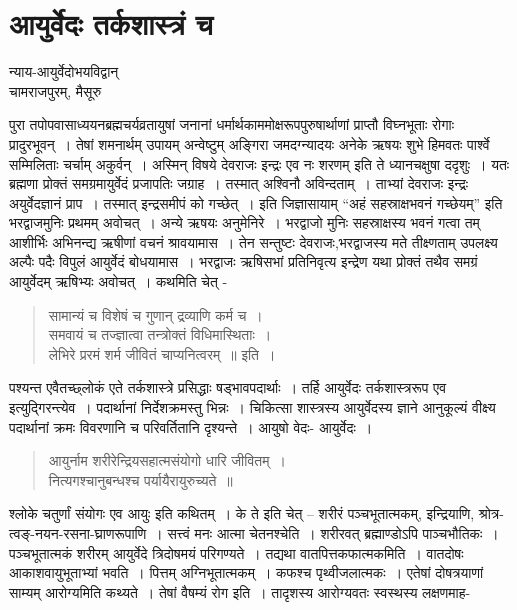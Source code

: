 {\fontsize{15}{17}\selectfont
\presetvalues
\chapter{आयुर्वेदः तर्कशास्त्रं च}

\begin{center}
\smallskip

न्याय-आयुर्वेदोभयविद्वान्\\
चामराजपुरम्, मैसूरु
\addrule
\end{center}

पुरा तपोपवासाध्ययनब्रह्मचर्यव्रतायुषां जनानां धर्मार्थकाममोक्षरूपपुरुषार्थाणां प्राप्तौ विघ्नभूताः रोगाः प्रादुरभूवन्~। तेषां शमनार्थम् उपायम् अन्वेष्टुम् अङ्गिरा जमदग्न्यादयः अनेके ऋषयः शुभे हिमवतः पार्श्वे सम्मिलिताः चर्चाम् अकुर्वन्~। अस्मिन् विषये देवराजः इन्द्रः एव नः शरणम् इति ते ध्यानचक्षुषा ददृशुः~। यतः ब्रह्मणा प्रोक्तं समग्रमायुर्वेदं प्रजापतिः जग्राह~। तस्मात् अश्विनौ अविन्दताम्~। ताभ्यां देवराजः इन्द्रः अयुर्वेदज्ञानं प्राप~। तस्मात् इन्द्रसमीपं को गच्छेत्~। इति जिज्ञासायाम् “अहं सहस्राक्षभवनं गच्छेयम्” इति भरद्वाजमुनिः प्रथमम् अवोचत्~। अन्ये ऋषयः अनुमेनिरे~। भरद्वाजो मुनिः सहस्राक्षस्य भवनं गत्वा तम् आशीर्भिः अभिनन्द्य ऋषीणां वचनं श्रावयामास~। तेन सन्तुष्टः देवराजः,भरद्वाजस्य मते तीक्ष्णताम् उपलक्ष्य अल्पैः पदैः विपुलं आयुर्वेदं बोधयामास~। भरद्वाजः ऋषिसभां प्रतिनिवृत्य इन्द्रेण यथा प्रोक्तं तथैव समग्रं आयुर्वेदम् ऋषिभ्यः अवोचत्~। कथमिति चेत् -
\begin{verse}
सामान्यं च विशेषं च गुणान् द्रव्याणि कर्म च~। \\
समवायं च तज्ज्ञात्वा तन्त्रोक्तं विधिमास्थिताः~। \\
लेभिरे प्ररमं शर्म जीवितं चाप्यनित्वरम्~॥ इति~। 
\end{verse}
पश्यन्त एवैतच्छ्लोकं एते तर्कशास्त्रे प्रसिद्धाः षड्भावपदार्थाः~। तर्हि आयुर्वेदः तर्कशास्त्ररूप एव इत्युद्गिरन्त्येव~। पदार्थानां निर्देशक्रमस्तु भिन्नः~। चिकित्सा शास्त्रस्य आयुर्वेदस्य ज्ञाने आनुकूल्यं वीक्ष्य पदार्थानां क्रमः विवरणानि च परिवर्तितानि दृश्यन्ते~। आयुषो वेदः- आयुर्वेदः~। 
\begin{verse}
आयुर्नाम शरीरेन्द्रियसहात्मसंयोगो धारि जीवितम्~। \\
नित्यगश्चानुबन्धश्च पर्यायैरायुरुच्यते~॥
\end{verse}
श्लोके चतुर्णां संयोगः एव आयुः इति कथितम्~। के ते इति चेत् – शरीरं पञ्चभूतात्मकम्, इन्द्रियाणि, श्रोत्र-त्वङ्-नयन-रसना-घ्राणरूपाणि~। सत्त्वं मनः आत्मा चेतनश्चेति~। शरीरवत् ब्रह्माण्डोऽपि पाञ्चभौतिकः~। पञ्चभूतात्मकं शरीरम् आयुर्वेदे त्रिदोषमयं परिगण्यते~। तद्यथा वातपित्तकफात्मकमिति~। वातदोषः आकाशवायुभूताभ्यां भवति~। पित्तम् अग्निभूतात्मकम्~। कफश्च पृथ्वीजलात्मकः~। एतेषां दोषत्रयाणां साम्यम् आरोग्यमिति कथ्यते~। तेषां वैषम्यं रोग इति~। तादृशस्य आरोग्यवतः स्वस्थस्य लक्षणमाह-
}
